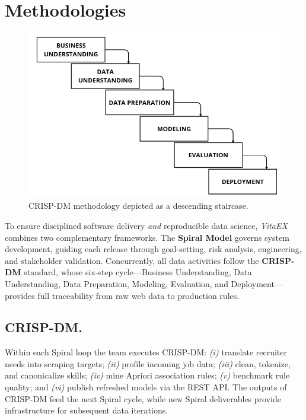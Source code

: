 \documentclass{svproc} %
\begin{document}
	
	\newpage
	
\section{Methodologies}


\begin{figure}[h]
	\centering
	\includegraphics[width=0.9\linewidth]{imagenes/cascada.png}
	\caption{CRISP-DM methodology depicted as a descending staircase.}
	\label{fig:blocks}
\end{figure}





To ensure disciplined software delivery \emph{and} reproducible data science, \textit{VitaEX} combines two complementary frameworks.  
The \textbf{Spiral Model} governs system development, guiding each release through goal-setting, risk analysis, engineering, and stakeholder validation.  
Concurrently, all data activities follow the \textbf{CRISP-DM} standard, whose six-step cycle—Business Understanding, Data Understanding, Data Preparation, Modeling, Evaluation, and Deployment—provides full traceability from raw web data to production rules.


	
	
	
	\subsection{\textbf{CRISP-DM.}}
	Within each Spiral loop the team executes CRISP-DM:  
	\emph{(i)} translate recruiter needs into scraping targets;  
	\emph{(ii)} profile incoming job data;  
	\emph{(iii)} clean, tokenize, and canonicalize skills;  
	\emph{(iv)} mine Apriori association rules;  
	\emph{(v)} benchmark rule quality; and  
	\emph{(vi)} publish refreshed models via the REST API.  
	The outputs of CRISP-DM feed the next Spiral cycle, while new Spiral deliverables provide infrastructure for subsequent data iterations.
	
\end{document}
